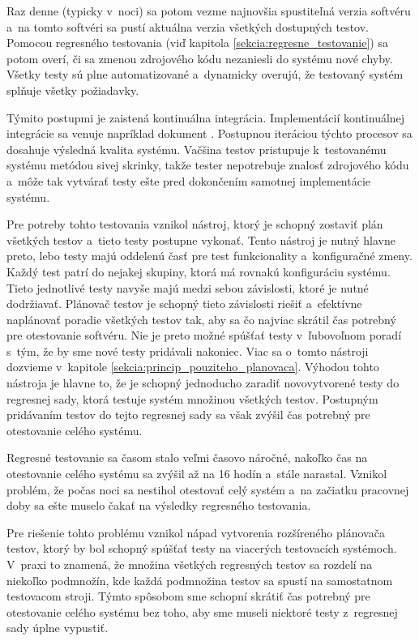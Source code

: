 Raz denne (typicky v~noci) sa potom vezme najnovšia spustiteľná verzia 
softvéru a~na tomto softvéri sa pustí aktuálna verzia všetkých dostupných 
testov. Pomocou regresného testovania 
(viď kapitola \ref{sekcia:regresne_testovanie}) sa potom overí, či sa 
zmenou zdrojového kódu nezaniesli do systému nové chyby. 
Všetky testy sú plne automatizované a~dynamicky overujú, že testovaný 
systém splňuje všetky požiadavky.

Týmito postupmi je zaistená kontinuálna integrácia. 
Implementácií kontinuálnej integrácie sa venuje napríklad dokument 
\cite{Continuous_integration_implementation}. 
Postupnou iteráciou týchto procesov sa dosahuje výsledná kvalita systému. 
Vačšina testov pristupuje k~testovanému systému metódou sivej skrinky, 
takže tester nepotrebuje znalosť zdrojového kódu a~môže tak vytvárať 
testy ešte pred dokončením samotnej implementácie systému. 

Pre potreby tohto testovania vznikol nástroj, ktorý je schopný zostaviť 
plán všetkých testov a~tieto testy postupne vykonať. Tento nástroj je
nutný hlavne preto, lebo testy majú oddelenú časť pre
test funkcionality a~konfiguračné zmeny. Každý test patrí do nejakej 
skupiny, ktorá má rovnakú konfiguráciu systému. 
Tieto jednotlivé testy navyše majú medzi sebou závislosti, ktoré je 
nutné dodržiavať. Plánovač testov je schopný tieto závislosti riešiť 
a~efektívne naplánovať poradie všetkých testov tak, aby sa čo najviac 
skrátil čas potrebný pre otestovanie softvéru. Nie je preto možné spúšťať
testy v~ľubovoľnom poradí s~tým, že by sme nové testy pridávali nakoniec.
Viac sa o~tomto nástroji dozvieme v~kapitole
\ref{sekcia:princip_pouziteho_planovaca}.
Výhodou tohto nástroja je hlavne to, že je schopný jednoducho zaradiť 
novovytvorené testy do regresnej sady, ktorá testuje systém množinou 
všetkých testov. Postupným pridávaním testov do tejto regresnej sady sa 
však zvýšil čas potrebný pre otestovanie celého systému.

Regresné testovanie sa časom stalo veľmi časovo náročné, nakoľko čas na 
otestovanie celého systému sa zvýšil až na 16 hodín a~stále narastal.
Vznikol problém, že počas noci sa nestihol otestovať celý systém a~na 
začiatku pracovnej doby sa ešte muselo čakať na výsledky regresného 
testovania. 

Pre riešenie tohto problému vznikol nápad vytvorenia 
rozšíreného plánovača testov, ktorý by bol schopný spúšťať testy na 
viacerých testovacích systémoch.
V~praxi to znamená, že množina všetkých regresných testov sa rozdelí na 
niekoľko podmnožín, kde každá podmnožina testov sa spustí na samostatnom
testovacom stroji. 
Týmto spôsobom sme schopní skrátiť čas potrebný pre otestovanie celého 
systému bez toho, aby sme museli niektoré testy z~regresnej sady 
úplne vypustiť. 

